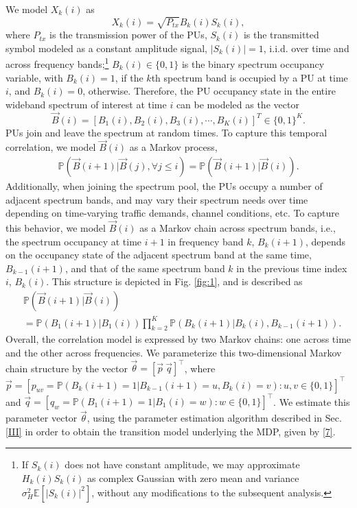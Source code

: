 \documentclass[10pt,twocolumn]{IEEEtran}
\begin{document}
We model $X_k(i)$ as
\begin{equation}\label{4}
    X_k(i) = \sqrt{P_{tx}}B_k(i)S_k(i),
\end{equation}
where $P_{tx}$ is the transmission power of the PUs, $S_k(i)$ is the transmitted symbol modeled as a constant amplitude signal, $|S_k(i)|{=}1$, i.i.d. over time and across frequency bands;\footnote{If $S_k(i)$ does not have constant amplitude, we may approximate $H_{k}(i)S_{k}(i)$ as complex Gaussian with zero mean and variance $\sigma_H^2\mathbb E[|S_{k}(i)|^2]$, without any modifications to the subsequent analysis.} $B_k(i){\in}\{0,1\}$ is the binary spectrum occupancy variable, with $B_k(i){=}1$, if the $k$th spectrum band is occupied by a PU at time $i$, and $B_k(i){=}0$, otherwise. Therefore, the PU occupancy state in the entire wideband spectrum of interest at time $i$ can be modeled as the vector 
\begin{equation}\label{5}
    \vec{B}(i) = [B_1(i), B_2(i), B_3(i), \cdots, B_K(i)]^T {\in} \{0, 1\}^K.
\end{equation}
PUs join and leave the spectrum at random times. To capture this temporal correlation, we model $\vec{B}(i)$ as a Markov process,
\begin{equation}\label{6}
    \begin{aligned}
        \mathbb{P}(\vec{B}(i+1)|\vec{B}(j), \forall j \leq i) = \mathbb{P}(\vec{B}(i+1)|\vec{B}(i)).
    \end{aligned}
\end{equation}
Additionally, when joining the spectrum pool, the PUs occupy a number of adjacent spectrum bands, and may vary their spectrum needs over time depending on time-varying traffic demands, channel conditions, etc. To capture this behavior, we model $\vec{B}(i)$ as a Markov chain across spectrum bands, i.e., the spectrum occupancy at time $i{+}1$ in frequency band $k$, $B_{k}(i{+}1)$, depends on the occupancy state of the adjacent spectrum band at the same time, $B_{k{-}1}(i{+}1)$, and that of the same spectrum band $k$ in the previous time index $i$, $B_{k}(i)$. This structure is depicted in Fig. \ref{fig:1}, and is described as
\begin{align}\label{7}
&         \mathbb{P}(\vec{B}(i+1)|\vec{B}(i))\\&=
\nonumber
         \mathbb{P}(B_{1}(i+1)|B_{1}(i))
         \prod_{k=2}^{K} \mathbb{P}(B_{k}(i+1)|B_{k}(i), B_{k-1}(i+1)).
\end{align}
Overall, the correlation model is expressed by two Markov chains: one across time and the other across frequencies. We parameterize this two-dimensional Markov chain structure by the vector $\vec{\theta}{=}[\vec{p}\ \vec{q}]^\intercal$, where $\vec{p}{=}[p_{uv}{=}\mathbb{P}(B_{k}(i{+}1){=}1|B_{k{-}1}(i{+}1){=}u,B_{k}(i){=}v){:} u,v{\in}\{0,1\}]^{\intercal}$ and $\vec{q}{=}[q_{w}{=}\mathbb{P}(B_{1}(i{+}1){=}1|B_{1}(i){=}w){:}w{\in}\{0,1\}]^\intercal$. We estimate this parameter vector $\vec{\theta}$, using the parameter estimation algorithm described in Sec. \ref{III} in order to obtain the transition model underlying the MDP, given by \eqref{7}.
\end{document}
